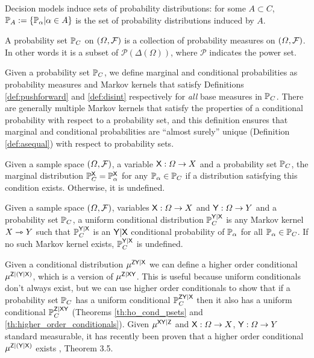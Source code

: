 Decision models induce sets of probability distributions: for some $A\subset C$, $\mathbb{P}_A:=\{\mathbb{P}_\alpha|\alpha\in A\}$ is the set of probability distributions induced by $A$.

\begin{definition}\label{def:prob_set}
A probability set $\mathbb{P}_C$ on $(\Omega,\mathcal{F})$ is a collection of probability measures on $(\Omega,\mathcal{F})$. In other words it is a subset of $\mathscr{P}(\Delta(\Omega))$, where $\mathscr{P}$ indicates the power set.
\end{definition}

Given a probability set $\mathbb{P}_C$, we define marginal and conditional probabilities as probability measures and Markov kernels that satisfy Definitions \ref{def:pushforward} and \ref{def:disint} respectively for \emph{all} base measures in $\mathbb{P}_C$. There are generally multiple Markov kernels that satisfy the properties of a conditional probability with respect to a probability set, and this definition ensures that marginal and conditional probabilities are ``almost surely'' unique (Definition \ref{def:asequal}) with respect to probability sets.

\begin{definition}
Given a sample space $(\Omega,\mathcal{F})$, a variable $\mathsf{X}:\Omega\to X$ and a probability set $\mathbb{P}_C$, the marginal distribution $\mathbb{P}_C^{\mathsf{X}}=\mathbb{P}_\alpha^{\mathsf{X}}$ for any $\mathbb{P}_\alpha\in\mathbb{P}_C$ if a distribution satisfying this condition exists. Otherwise, it is undefined.
\end{definition}

\begin{definition}\label{def:cprob_pset}
Given a sample space $(\Omega,\mathcal{F})$, variables $\mathsf{X}:\Omega\to X$ and $\mathsf{Y}:\Omega\to Y$ and a probability set $\mathbb{P}_C$, a uniform conditional distribution $\mathbb{P}_C^{\mathsf{Y}|\mathsf{X}}$ is any Markov kernel $X\rightarrowtriangle Y$ such that $\mathbb{P}_C^{\mathsf{Y}|\mathsf{X}}$ is an $\mathsf{Y}|\mathsf{X}$ conditional probability of $\mathbb{P}_\alpha$ for all $\mathbb{P}_\alpha\in \mathbb{P}_C$. If no such Markov kernel exists, $\mathbb{P}_C^{\mathsf{Y}|\mathsf{X}}$ is undefined.
\end{definition}

Given a conditional distribution $\mu^{\mathsf{ZY}|\mathsf{X}}$ we can define a higher order conditional $\mu^{\mathsf{Z}|(\mathsf{Y}|\mathsf{X})}$, which is a version of $\mu^{\mathsf{Z}|\mathsf{XY}}$. This is useful because uniform conditionals don't always exist, but we can use higher order conditionals to show that if a probability set $\mathbb{P}_C$ has a uniform conditional $\mathbb{P}_C^{\mathsf{ZY}|\mathsf{X}}$ then it also has a uniform conditional $\mathbb{P}_C^{\mathsf{Z}|\mathsf{XY}}$ (Theorems \ref{th:ho_cond_psets} and \ref{th:higher_order_conditionals}). Given $\mu^{\mathsf{XY}|\mathsf{Z}}$ and $\mathsf{X}:\Omega\to X$, $\mathsf{Y}:\Omega\to Y$ standard measurable, it has recently been proven that a higher order conditional $\mu^{\mathsf{Z}|(\mathsf{Y}|\mathsf{X})}$ exists \citet{bogachev_kantorovich_2020}, Theorem 3.5.


